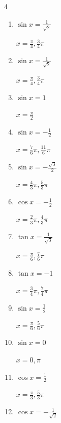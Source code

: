 \begin{multicols}{4}
\begin{enumerate}
  \item $\displaystyle \sin{x}  = \frac{1}{\sqrt{2}}$

        $\displaystyle x = \frac{\pi}{4} , \frac{3}{4}\pi$

  \item $\displaystyle \sin{x}  = \frac{1}{\sqrt{2}}$

        $\displaystyle x = \frac{\pi}{4} , \frac{3}{4}\pi$

  \item $\displaystyle \sin{x}  = 1$

        $\displaystyle x = \frac{\pi}{2}$

  \item $\displaystyle \sin{x}  = -\frac{1}{2}$

        $\displaystyle x = \frac{7}{6}\pi , \frac{11}{6}\pi$

  \item $\displaystyle \sin{x}  = -\frac{\sqrt{3}}{2}$

        $\displaystyle x = \frac{4}{3}\pi , \frac{5}{3}\pi$

  \item $\displaystyle \cos{x}  = -\frac{1}{2}$

        $\displaystyle x = \frac{2}{3}\pi , \frac{4}{3}\pi$

\columnbreak %

\resetques

  \item $\displaystyle \tan{x}  = \frac{1}{\sqrt{3}}$

        $\displaystyle x = \frac{\pi}{6} , \frac{7}{6}\pi$

  \item $\displaystyle \tan{x}  = -1$

        $\displaystyle x = \frac{3}{4}\pi , \frac{7}{4}\pi$

  \item $\displaystyle \sin{x}  = \frac{1}{2}$

        $\displaystyle x = \frac{\pi}{6} , \frac{5}{6}\pi$

  \item $\displaystyle \sin{x}  = 0$

        $\displaystyle x = 0 , \pi$

  \item $\displaystyle \cos{x}  = \frac{1}{2}$

        $\displaystyle x = \frac{\pi}{3} , \frac{5}{3}\pi$

  \item $\displaystyle \cos{x}  = -\frac{1}{\sqrt{2}}$


\end{enumerate}
\end{multicols}
